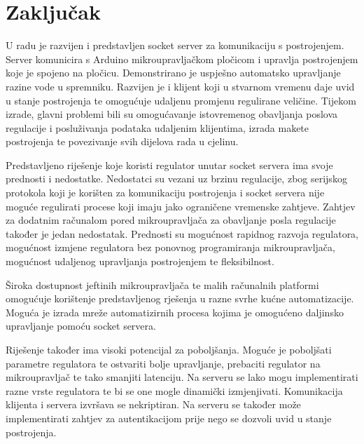 \newpage
\chapter{Zaključak}

U radu je razvijen i predstavljen socket server za komunikaciju s postrojenjem.
Server komunicira s Arduino mikroupravljačkom pločicom i upravlja postrojenjem
koje je spojeno na pločicu. Demonstrirano je uspješno automatsko upravljanje
razine vode u spremniku. Razvijen je i klijent koji u stvarnom vremenu daje uvid
u stanje postrojenja te omogućuje udaljenu promjenu regulirane veličine. Tijekom
izrade, glavni problemi bili su omogućavanje istovremenog obavljanja poslova
regulacije i posluživanja podataka udaljenim klijentima, izrada makete
postrojenja te povezivanje svih dijelova rada u cjelinu.

Predstavljeno riješenje koje koristi regulator unutar socket servera ima svoje
prednosti i nedostatke. Nedostatci su vezani uz brzinu regulacije, zbog
serijskog protokola koji je korišten za komunikaciju postrojenja i socket
servera nije moguće regulirati procese koji imaju jako ograničene vremenske
zahtjeve. Zahtjev za dodatnim računalom pored mikroupravljača za obavljanje
posla regulacije također je jedan nedostatak. Prednosti su mogućnost rapidnog
razvoja regulatora, mogućnost izmjene regulatora bez ponovnog programiranja
mikroupravljača, mogućnost udaljenog upravljanja postrojenjem te fleksibilnost.

Široka dostupnost jeftinih mikroupravljača te malih računalnih platformi
omogućuje korištenje predstavljenog rješenja u razne svrhe kućne
automatizacije. Moguća je izrada mreže automatizirnih procesa kojima je
omogućeno daljinsko upravljanje pomoću socket servera.

Riješenje također ima visoki potencijal za poboljšanja. Moguće je poboljšati
parametre regulatora te ostvariti bolje upravljanje, prebaciti regulator na
mikroupravljač te tako smanjiti latenciju. Na serveru se lako mogu
implementirati razne vrste regulatora te bi se one mogle dinamički izmjenjivati.
Komunikacija klijenta i servera izvršava se nekriptiran. Na serveru
se također može implementirati zahtjev za autentikacijom prije nego se dozvoli uvid u
stanje postrojenja.
